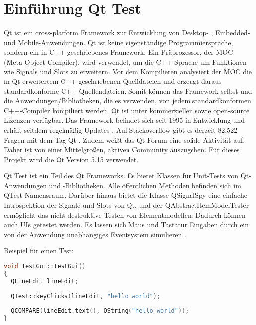 		\section{Einführung Qt Test}
		\paragraph{} Qt ist ein cross-platform Framework zur Entwicklung von Desktop- , Embedded- und Mobile-Anwendungen. Qt ist keine eigenständige Programmiersprache, sondern ein in C++ geschriebenes Framework. Ein Präprozessor, der MOC (Meta-Object Compiler), wird verwendet, um die C++-Sprache um Funktionen wie Signals und Slots zu erweitern. Vor dem Kompilieren analysiert der MOC die in Qt-erweitertem C++ geschriebenen Quelldateien und erzeugt daraus standardkonforme C++-Quellendateien. Somit können das Framework selbst und die Anwendungen/Bibliotheken, die es verwenden, von jedem standardkonformen C++-Compiler kompiliert werden. Qt ist unter kommerziellen sowie open-source Lizenzen verfügbar. Das Framework befindet sich seit 1995 in Entwicklung und erhält seitdem regelmäßig Updates \cite{QtWiki}. Auf Stackoverflow gibt es derzeit 82.522 Fragen mit dem Tag Qt \cite{QtQuestions}. Zudem weißt das Qt Forum eine solide Aktivität auf. Daher ist von einer Mittelgroßen, aktiven Community auszugehen. Für dieses Projekt wird die Qt Version 5.15 verwendet.
				
		Qt Test ist ein Teil des Qt Frameworks. Es bietet Klassen für Unit-Tests von Qt-Anwendungen und -Bibliotheken. Alle öffentlichen Methoden befinden sich im QTest-Namensraum. Darüber hinaus bietet die Klasse QSignalSpy eine einfache Introspektion der Signale und Slots von Qt, und der QAbstractItemModelTester ermöglicht das nicht-destruktive Testen von Elementmodellen. Dadurch können auch UIs getestet werden. Es lassen sich Maus und Tastatur Eingaben durch ein von der Anwendung unabhängiges Eventsystem simulieren \cite{documentationQt}.
		
		Beispiel für einen Test:
		\begin{lstlisting}[language=C++, caption=Hello World Beispiel]
void TestGui::testGui()
{
  QLineEdit lineEdit;
	
  QTest::keyClicks(lineEdit, "hello world");
		
  QCOMPARE(lineEdit.text(), QString("hello world"));
}
		\end{lstlisting}
